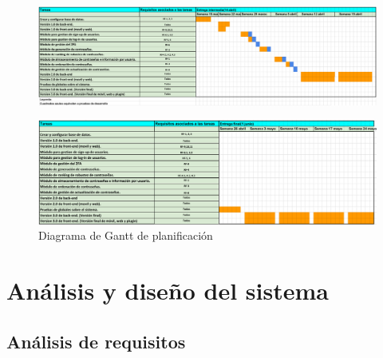 \documentclass{article}
\begin{document}
\begin{landscape}
   \begin{figure}[H]
       \centering
       \includegraphics[width=1.4\textheight]{../images/diag-gantt-1.png}
       \label{gantt-1}
   \end{figure}

   \begin{figure}[H]
       \centering
       \includegraphics[width=1.4\textheight]{../images/diag-gantt-2.png}
       \caption{Diagrama de Gantt de planificación}
       \label{gantt-2}
   \end{figure}
\end{landscape}

\pagebreak

\section{Análisis y diseño del sistema}

\subsection{Análisis de requisitos}
\end{document}
